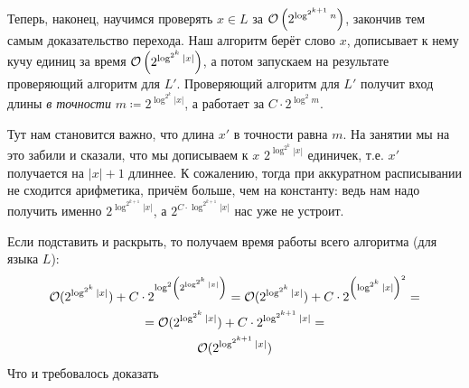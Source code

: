 		Теперь, наконец, научимся проверять $x \in L$ за $\mathcal O\left(2^{\log^{2^{k+1}} n}\right)$, закончив тем самым доказательство перехода.
		Наш алгоритм берёт слово $x$, дописывает к нему кучу единиц за время $\mathcal O\left(2^{\log^{2^k} |x|}\right)$,
		а потом запускаем на результате проверяющий алгоритм для $L'$.
		Проверяющий алгоритм для $L'$ получит вход длины \textit{в точности} $m \coloneq 2^{\log^{2^k} |x|}$, а работает
		за $C \cdot 2^{\log^2 m}$.
		\begin{Rem}
			Тут нам становится важно, что длина $x'$ в точности равна $m$.
			На занятии мы на это забили и сказали, что мы дописываем к $x$
			$2^{\log^{2^k} |x|}$ единичек, т.е. $x'$ получается на $|x|+1$ длиннее.
			К сожалению, тогда при аккуратном расписывании не сходится арифметика, причём больше, чем на константу:
			ведь нам надо получить именно $2^{\log^{2^{k+1}} |x|}$, а $2^{C\cdot \log^{2^{k+1}} |x|}$ нас уже не устроит.
		\end{Rem}
		Если подставить и раскрыть, то получаем время работы всего алгоритма (для языка $L$):
		\begin{gather*}
			\mathcal O(2^{\log^{2^k} |x|}) + C \cdot 2^{\log^2 \left(2^{\log^{2^k} |x|} \right)} =
			\mathcal O(2^{\log^{2^k} |x|}) + C \cdot 2^{\left(\log^{2^k} |x|\right)^2} = \\
			= \mathcal O(2^{\log^{2^k} |x|}) + C \cdot 2^{\log^{2^{k+1}} |x|} = \\
			\mathcal O(2^{\log^{2^{k+1}} |x|})
		\end{gather*}
		Что и требовалось доказать

